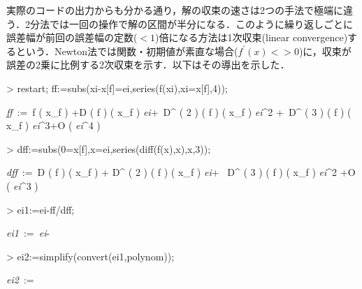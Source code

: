 実際のコードの出力からも分かる通り，解の収束の速さは2つの手法で極端に違う．2分法では一回の操作で解の区間が半分になる．このように繰り返しごとに誤差幅が前回の誤差幅の定数($<1$)倍になる方法は1次収束(linear convergence)するという．Newton法では関数・初期値が素直な場合($f^{\prime}(x) <> 0$)に，収束が誤差の2乗に比例する2次収束を示す．以下はその導出を示した．


\begin{MapleInput}
> restart; ff:=subs(xi-x[f]=ei,series(f(xi),xi=x[f],4));
\end{MapleInput}

\begin{MapleOutput}
{\it ff}\, := \,f \left( x_{{f}} \right) +D \left( f \right)  \left( x_{{f}} \right) {\it ei}+\,  D^{ \left( 2 \right) }   \left( f \right)  \left( x_{{f}} \right) {{\it ei}}^{2} +\, 
D^{ \left( 3 \right) }   \left( f \right)  \left( x_{{f}} \right) {{\it ei}}^{3}+O \left( {{\it ei}}^{4} \right)
\end{MapleOutput}
\begin{MapleInput}
> dff:=subs({0=x[f],x=ei},series(diff(f(x),x),x,3));
\end{MapleInput}
\begin{MapleOutput}
{\it dff}\, := \,D \left( f \right)  \left( x_{{f}} \right) + 
D^{ \left( 2 \right) } \left( f \right)  \left( x_{{f}} \right) {\it ei}+
\, D^{ \left( 3 \right) } \left( f \right)  \left( x_{{f}} \right) {{\it ei}}^{2} +O \left( {{\it ei}}^{3} \right)
\end{MapleOutput}
\begin{MapleInput}
> ei1:=ei-ff/dff;
\end{MapleInput}
\begin{MapleOutput}
{\it ei1}\, := \,{\it ei}-{}
\end{MapleOutput}
\begin{MapleInput}
> ei2:=simplify(convert(ei1,polynom));
\end{MapleInput}
\begin{MapleOutput}
{\it ei2}\, := \,\,
\end{MapleOutput}
